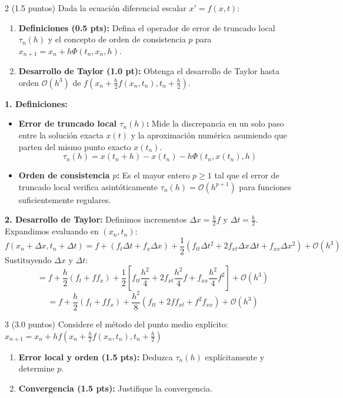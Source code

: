\begin{ejer}{2 (1.5 puntos)}
Dada la ecuación diferencial escalar $x' = f(x,t)$:
\begin{enumerate}
    \item \textbf{Definiciones (0.5 pts):} Defina el operador de error de truncado local $\tau_n(h)$ y el concepto de orden de consistencia $p$ para $x_{n+1} = x_n + h\Phi(t_n, x_n, h)$.
    \item \textbf{Desarrollo de Taylor (1.0 pt):} Obtenga el desarrollo de Taylor hasta orden $\mathcal{O}(h^3)$ de $f\left(x_n + \frac{h}{2}f(x_n, t_n), t_n + \frac{h}{2}\right)$.
\end{enumerate}
\end{ejer}

\begin{sol}
\textbf{1. Definiciones:}
\begin{itemize}[label=-]
    \item \textbf{Error de truncado local $\tau_n(h)$:} Mide la discrepancia en un solo paso entre la solución exacta $x(t)$ y la aproximación numérica asumiendo que parten del mismo punto exacto $x(t_n)$.
    $$ \tau_n(h) = x(t_n + h) - x(t_n) - h\Phi(t_n, x(t_n), h) $$
    \item \textbf{Orden de consistencia $p$:} Es el mayor entero $p \ge 1$ tal que el error de truncado local verifica asintóticamente $\tau_n(h) = \mathcal{O}(h^{p+1})$ para funciones suficientemente regulares.
\end{itemize}

\textbf{2. Desarrollo de Taylor:}
Definimos incrementos $\Delta x = \frac{h}{2}f$ y $\Delta t = \frac{h}{2}$. Expandimos evaluando en $(x_n, t_n)$:
$$ f(x_n + \Delta x, t_n + \Delta t) = f + (f_t \Delta t + f_x \Delta x) + \frac{1}{2}(f_{tt} \Delta t^2 + 2f_{xt}\Delta x\Delta t + f_{xx}\Delta x^2) + \mathcal{O}(h^3) $$
Sustituyendo $\Delta x$ y $\Delta t$:
$$ = f + \frac{h}{2}(f_t + f f_x) + \frac{1}{2} \left[ f_{tt}\frac{h^2}{4} + 2f_{xt}\frac{h^2}{4}f + f_{xx}\frac{h^2}{4}f^2 \right] + \mathcal{O}(h^3) $$
$$ = f + \frac{h}{2}(f_t + f f_x) + \frac{h^2}{8}(f_{tt} + 2f f_{xt} + f^2 f_{xx}) + \mathcal{O}(h^3) $$
\end{sol}

\begin{ejer}{3 (3.0 puntos)}
Considere el método del punto medio explícito:
$x_{n+1} = x_n + h f\left(x_n + \frac{h}{2}f(x_n, t_n), t_n + \frac{h}{2}\right)$
\begin{enumerate}
    \item \textbf{Error local y orden (1.5 pts):} Deduzca $\tau_n(h)$ explícitamente y determine $p$.
    \item \textbf{Convergencia (1.5 pts):} Justifique la convergencia.
\end{enumerate}
\end{ejer}

